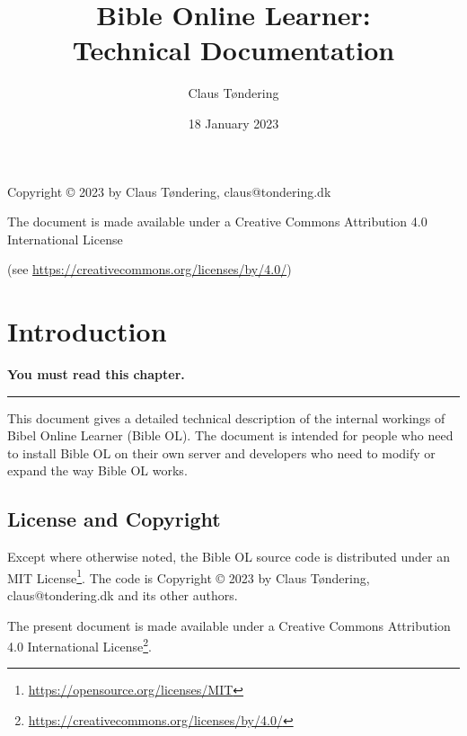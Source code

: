 \documentclass[11pt,oneside,a4paper]{memoir}
\title{Bible Online Learner:\\Technical Documentation}
\author{Claus Tøndering}
\date{18 January 2023}
\begin{document}
\begin{titlingpage*}
\maketitle

\begin{center}
Copyright © 2023 by Claus Tøndering, claus@tondering.dk

\vspace{5mm}

The document is made available under a Creative Commons Attribution 4.0 International License

(see \url{https://creativecommons.org/licenses/by/4.0/})
\end{center}
\end{titlingpage*}


\clearpage
\tableofcontents
{} %

\chapter{Introduction}

\textbf{You must read this chapter.}
\plainbreak{3}

This document gives a detailed technical description of the internal workings of Bibel Online
Learner (Bible OL). The document is intended for people who need to install Bible OL on their own
server and developers who need to modify or expand the way Bible OL works.

\section{License and Copyright}

Except where otherwise noted, the Bible OL source code is distributed under an MIT
License\footnote{\url{https://opensource.org/licenses/MIT}}. The code is Copyright © 2023 by Claus
Tøndering, claus@tondering.dk and its other authors.

The present document is made available under a Creative Commons Attribution 4.0 International
License\footnote{\url{https://creativecommons.org/licenses/by/4.0/}}.


\end{document}

